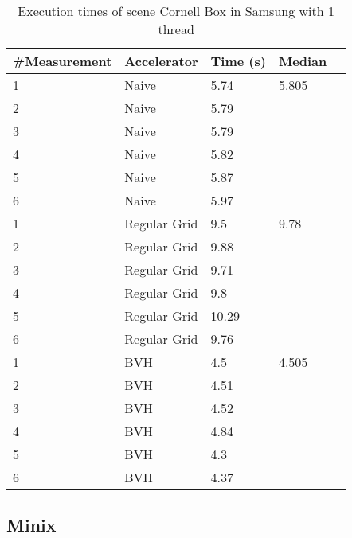\begin{table}[H]
	\small
	\begin{tabular}{|l|l|l|l|l|}
		\hline
		\#Measurement & Accelerator & Time (s) & Median \\ \hline
		1 & Naive & 5.74 & 5.805 \\ \hline
		2 & Naive & 5.79 & \\ \hline
		3 & Naive & 5.79 & \\ \hline
		4 & Naive & 5.82 & \\ \hline
		5 & Naive & 5.87 & \\ \hline
		6 & Naive & 5.97 & \\ \hline
		1 & Regular Grid & 9.5 & 9.78 \\ \hline
		2 & Regular Grid & 9.88 & \\ \hline
		3 & Regular Grid & 9.71 & \\ \hline
		4 & Regular Grid & 9.8 & \\ \hline
		5 & Regular Grid & 10.29 & \\ \hline
		6 & Regular Grid & 9.76 & \\ \hline
		1 & BVH & 4.5 & 4.505 \\ \hline
		2 & BVH & 4.51 & \\ \hline
		3 & BVH & 4.52 & \\ \hline
		4 & BVH & 4.84 & \\ \hline
		5 & BVH & 4.3 & \\ \hline
		6 & BVH & 4.37 & \\ \hline
	\end{tabular}
	\label{Time}
	\caption{Execution times of scene Cornell Box in Samsung with 1 thread}
\end{table}


\subsection{Minix}

\par


